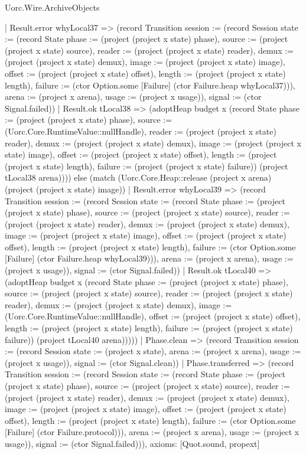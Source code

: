 \begin{lexlean}{Uorc.Wire.ArchiveObjects}
\begin{semanticmodule}
{      | Result.error whyLocal37 => (record Transition {session := (record Session {state := (record State {phase := (project (project x state) phase), source := (project (project x state) source), reader := (project (project x state) reader), demux := (project (project x state) demux), image := (project (project x state) image), offset := (project (project x state) offset), length := (project (project x state) length), failure := (ctor Option.some [Failure] (ctor Failure.heap whyLocal37))}), arena := (project x arena), usage := (project x usage)}), signal := (ctor Signal.failed)})
      | Result.ok tLocal38 => (adoptHeap budget x (record State {phase := (project (project x state) phase), source := (Uorc.Core.RuntimeValue::nullHandle), reader := (project (project x state) reader), demux := (project (project x state) demux), image := (project (project x state) image), offset := (project (project x state) offset), length := (project (project x state) length), failure := (project (project x state) failure)}) (project tLocal38 arena)))) else (match (Uorc.Core.Heap::release (project x arena) (project (project x state) image))
      | Result.error whyLocal39 => (record Transition {session := (record Session {state := (record State {phase := (project (project x state) phase), source := (project (project x state) source), reader := (project (project x state) reader), demux := (project (project x state) demux), image := (project (project x state) image), offset := (project (project x state) offset), length := (project (project x state) length), failure := (ctor Option.some [Failure] (ctor Failure.heap whyLocal39))}), arena := (project x arena), usage := (project x usage)}), signal := (ctor Signal.failed)})
      | Result.ok tLocal40 => (adoptHeap budget x (record State {phase := (project (project x state) phase), source := (project (project x state) source), reader := (project (project x state) reader), demux := (project (project x state) demux), image := (Uorc.Core.RuntimeValue::nullHandle), offset := (project (project x state) offset), length := (project (project x state) length), failure := (project (project x state) failure)}) (project tLocal40 arena)))))
    | Phase.clean => (record Transition {session := (record Session {state := (project x state), arena := (project x arena), usage := (project x usage)}), signal := (ctor Signal.clean)})
    | Phase.transferred => (record Transition {session := (record Session {state := (record State {phase := (project (project x state) phase), source := (project (project x state) source), reader := (project (project x state) reader), demux := (project (project x state) demux), image := (project (project x state) image), offset := (project (project x state) offset), length := (project (project x state) length), failure := (ctor Option.some [Failure] (ctor Failure.protocol))}), arena := (project x arena), usage := (project x usage)}), signal := (ctor Signal.failed)})),
  axioms: [Quot.sound, propext]
}


\end{semanticmodule}
\end{lexlean}
